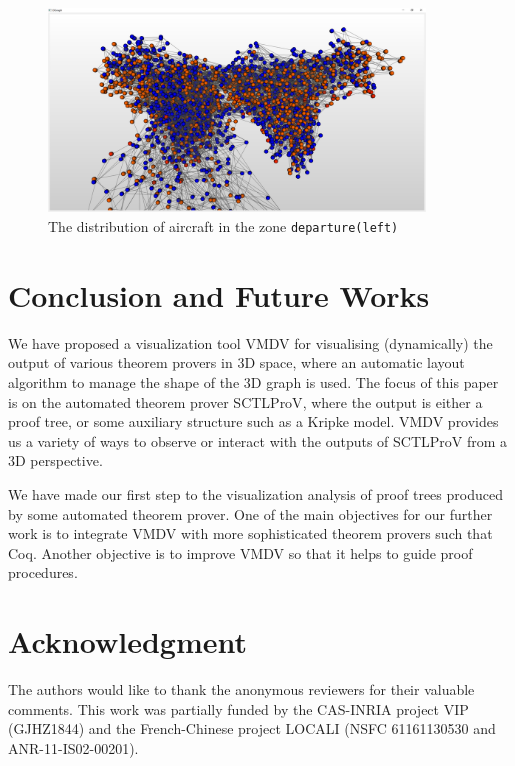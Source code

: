 \documentclass[runningheads]{llncs}
\newcommand\tool[1]{\textsf{#1}}
\newcommand\vmdv{\tool{VMDV}}
\begin{document}
\begin{example} 
	\begin{figure}[h!]
		\centering
		\includegraphics[width=10cm]{sats_departureleft.png}
		\caption{The distribution of aircraft in the zone {\tt departure(left)}}
		\label{fig:sats:departureleft}
	\end{figure}
	
\end{example}
 

\section{Conclusion and Future Works}

We have proposed a visualization tool \vmdv{} for visualising (dynamically) the output of various theorem provers in 3D space, 
where an automatic layout algorithm to manage the shape of the 3D graph is used.
The focus of this paper is on the automated theorem prover \textsf{SCTLProV}, where the output is either a proof tree, or some auxiliary structure such as a Kripke model.
\vmdv{} provides us a variety of ways to observe or interact with the outputs of \textsf{SCTLProV} from a 3D perspective.


We have made our first step to the visualization analysis of proof trees produced by some automated theorem prover.
One of the main objectives for our further work is to integrate \vmdv{} with more sophisticated theorem provers such that \textsf{Coq}.
Another objective is to improve \vmdv{} so that it helps to guide proof procedures.

\section*{Acknowledgment}
The authors would like to thank the anonymous reviewers for their valuable comments.
This work was partially funded by the CAS-INRIA project VIP (GJHZ1844) and the French-Chinese project LOCALI (NSFC 61161130530 and ANR-11-IS02-00201).






\end{document}
